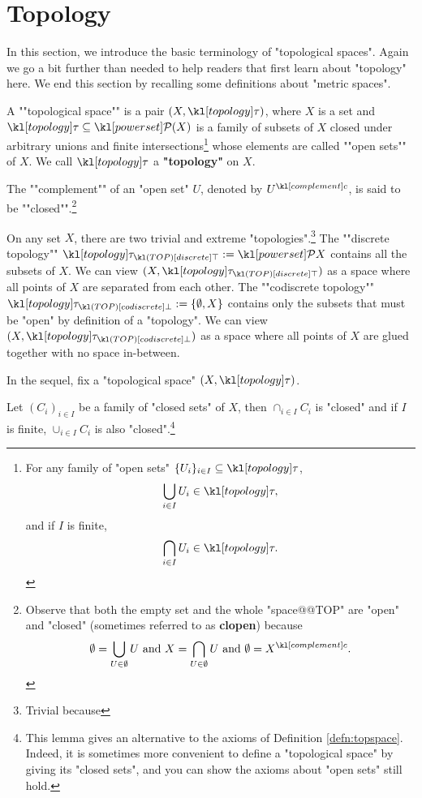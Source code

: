 \documentclass[main.tex]{subfiles}
\begin{document}
\section{Topology}
In this section, we introduce the basic terminology of "topological spaces". Again we go a bit further than needed to help readers that first learn about "topology" here. We end this section by recalling some definitions about "metric spaces". 
\begin{defn}\label{defn:topspace}
	\AP A ""topological space"" is a pair $(X, \topo)$, where $X$ is a set and $\topo\subseteq \mP(X)$ is a family of subsets of $X$ closed under arbitrary unions and finite intersections\footnote{For any family of "open sets" $\{U_i\}_{i \in I}\subseteq \topo$,\[\bigcup_{i \in I} U_i \in \topo,\] and if $I$ is finite,\[\bigcap_{i \in I} U_i \in \topo.\]} whose elements are called ""open sets"" of $X$. We call $\topo$ a \textbf{"topology"} on $X$.
	
	\AP The ""complement"" of an "open set" $U$, denoted by $U^\comple$, is said to be ""closed"".\footnote{Observe that both the empty set and the whole "space@@TOP" are "open" and "closed" (sometimes referred to as \textbf{clopen}) because 
	\[\emptyset = \bigcup_{U \in \emptyset} U \text{ and } X = \bigcap_{U \in \emptyset} U \text { and } \emptyset = X^\comple.\]}
\end{defn}
\begin{exmp}
	On any set $X$, there are two trivial and extreme "topologies".\footnote{Trivial because } \AP The ""discrete topology"" $\topo_{\disc} := \mP X$ contains all the subsets of $X$. We can view $(X,\topo_{\disc})$ as a space where all points of $X$ are separated from each other. \AP The ""codiscrete topology"" $\topo_{\codisc} := \{\emptyset, X\}$ contains only the subsets that must be "open" by definition of a "topology". We can view $(X,\topo_{\codisc})$ as a space where all points of $X$ are glued together with no space in-between.
\end{exmp}
In the sequel, fix a "topological space" $(X,\topo)$.
\begin{prop}
	Let $(C_i)_{i \in I}$ be a family of "closed sets" of $X$, then $\cap_{i \in I} C_i$ is "closed" and if $I$ is finite, $\cup_{i \in I} C_i$ is also "closed".\footnote{This lemma gives an alternative to the axioms of Definition \ref{defn:topspace}. Indeed, it is sometimes more convenient to define a "topological space" by giving its "closed sets", and you can show the axioms about "open sets" still hold.}
\end{prop}
\end{document}
